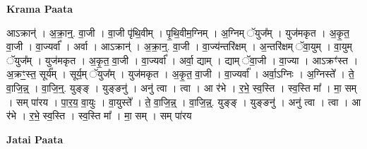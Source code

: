 \documentclass[17pt]{extarticle}
\begin{document}
\textbf{Krama Paata} \newline

आऽक्रान्॑ । अ॒क्रा॒न्॒. वा॒जी । वा॒जी पृ॑थि॒वीम् । पृ॒थि॒वीम॒ग्निम् । अ॒ग्निम् ॅयुज᳚म् । युज॑मकृत । अ॒कृ॒त॒ वा॒जी । वा॒ज्यर्वा᳚ । अर्वा । आऽक्रान्॑ । अ॒क्रा॒न्॒. वा॒जी । वा॒ज्य॑न्तरि॑क्षम् । अ॒न्तरि॑क्षम् ॅवा॒युम् । वा॒युम् ॅयुज᳚म् । युज॑मकृत । अ॒कृ॒त॒ वा॒जी । वा॒ज्यर्वा᳚ । अर्वा॒ द्याम् । द्याम् ॅवा॒जी । वा॒ज्या । आऽक्रꣳ॑स्त । अ॒क्रꣳ॒॒स्त॒ सूर्य᳚म् । सूर्य॒म् ॅयुज᳚म् । युज॑मकृत । अ॒कृ॒त॒ वा॒जी । वा॒ज्यर्वा᳚ । अर्वा॒ऽग्निः । अ॒ग्निस्ते᳚ । ते॒ वा॒जि॒न्न्॒ । वा॒जि॒न्॒. युङ्‍ङ् । युङ्‍ङनु॑ । अनु॑ त्वा । त्वा । आ र॑भे । र॒भे॒ स्व॒स्ति । स्व॒स्ति मा᳚ । मा॒ सम् । सम् पा॑रय । पा॒र॒य॒ वा॒युः । वा॒युस्ते᳚ । ते॒ वा॒जि॒न्न्॒ । वा॒जि॒न्न्॒. युङ्‍ङ् । युङ्‍ङनु॑ । अनु॑ त्वा । त्वा । आ र॑भे । र॒भे॒ स्व॒स्ति । स्व॒स्ति मा᳚ । मा॒ सम् । सम् पा॑रय \newline

\textbf{Jatai Paata} \newline
\end{document}

